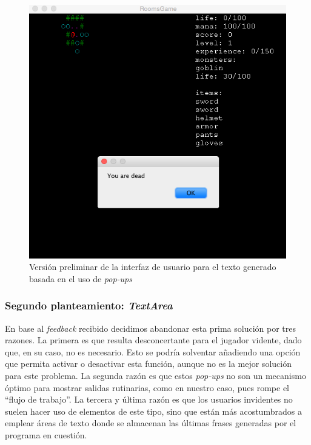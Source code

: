 \begin{figure}
    \includegraphics[width=\textwidth,height=\textheight,keepaspectratio]{./img/firstiterationui.png}
  \caption{Versión preliminar de la interfaz de usuario para el texto generado basada en el uso de \textit{pop-ups}}
  \label{fig:firstiterationui}
\end{figure}

\subsubsection{Segundo planteamiento: \textit{TextArea}}

En base al \textit{feedback} recibido decidimos abandonar esta prima solución por tres razones. La primera es que resulta desconcertante para el jugador vidente, dado que, en su caso, no es necesario. Esto se podría solventar añadiendo una opción que permita activar o desactivar esta función, aunque no es la mejor solución para este problema.
La segunda razón es que estos \textit{pop-ups} no son un mecanismo óptimo para mostrar salidas rutinarias, como en nuestro caso, pues rompe el ``flujo de trabajo''.
La tercera y última razón es que los usuarios invidentes no suelen hacer uso de elementos de este tipo, sino que están más acostumbrados a emplear áreas de texto donde se almacenan las últimas frases generadas por el programa en cuestión.


